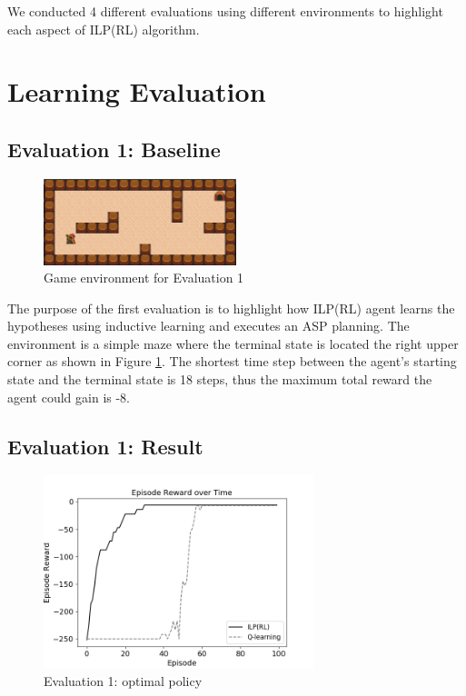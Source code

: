 We conducted 4 different evaluations using different environments to highlight each aspect of ILP(RL) algorithm.
\section{Learning Evaluation}
\label{sec:learning_evaluation}

\subsection{Evaluation 1: Baseline}
\label{subsec:experiement1_setup}

\begin{figure}[!htb]
\centering
\includegraphics[width=0.5\textwidth]{./figures/experiment1}
\caption{Game environment for Evaluation 1}
\label{fig:experiment1}
\end{figure}
    
The purpose of the first evaluation is to highlight how ILP(RL) agent learns the hypotheses using inductive learning and executes an ASP planning.
The environment is a simple maze where the terminal state is located the right upper corner as shown in Figure \ref{fig:experiment1}.
The shortest time step between the agent's starting state and the terminal state is 18 steps, thus the maximum total reward the agent could gain is -8.

\subsection{Evaluation 1: Result}
\label{subsec:experiment1_result}

\begin{figure}[!htb]
\centering
\includegraphics[width=0.7\textwidth]{./figures/experiment1_test}
\caption{Evaluation 1: optimal policy }
\label{experiment1_result}
\end{figure}

